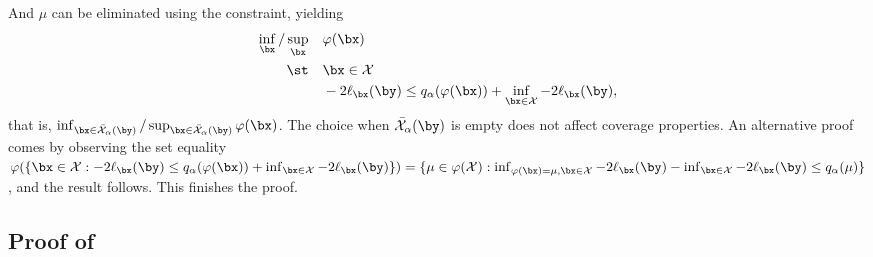 \documentclass[11pt]{article}
\numberwithin{equation}{section}
\numberwithin{figure}{section}
\begin{document}
And $\mu$ can be eliminated using the constraint, yielding
\begin{equation}\label{param_space}
\begin{aligned}
\inf_{\bx}/\sup_{\bx} \quad & \varphi(\bx) \\
\st \quad & \bx \in \mathcal X\\
& -2\ell_{\bx}(\by) \leq q_\alpha(\varphi(\bx))+ \inf_{\bx \in \mathcal X} -2\ell_{\bx}(\by),
\end{aligned}
\end{equation}
that is, $\inf_{\bx \in  \bar{\mathcal X}_\alpha(\by)}/\sup_{\bx \in  \bar{\mathcal X}_\alpha(\by)} \varphi(\bx)$. 
The choice when $\bar{\mathcal X}_\alpha(\by)$ is empty does not affect coverage properties. 
An alternative proof comes by observing the set equality $\varphi(\{\bx \in \mathcal{X}: -2\ell_{\bx}(\by) \leq q_\alpha(\varphi(\bx))+ \inf_{\bx \in \mathcal X} -2\ell_{\bx}(\by)\}) = \{\mu \in \varphi(\mathcal{X}):  \inf_{\varphi(\bx) = \mu, \bx \in \mathcal X} -2\ell_{\bx}(\by) - \inf_{\bx \in \mathcal X} -2\ell_{\bx}(\by)\leq q_\alpha(\mu)\}$, and the result follows. 
This finishes the proof.

\subsection{Proof of }\label{proof:main_converse}
\end{document}
